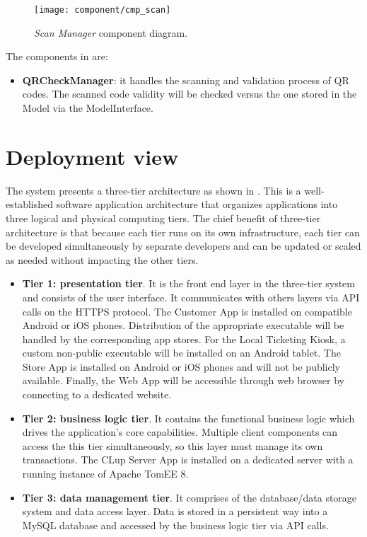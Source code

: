 \begin{figure}[H]
	\centering
	\texttt{[image: component/cmp\_scan]}
	\caption{\textit{Scan Manager} component diagram.}
	\label{fig:cmp_scan}
\end{figure}

The components in  are:
\begin{itemize}
	\item \textbf{QRCheckManager}: it handles the scanning and validation process of QR codes. The scanned code validity will be checked versus the one stored in the Model via the ModelInterface.
\end{itemize}
\clearpage

\section{Deployment view}
The system presents a three-tier architecture as shown in . This is a well-established software application architecture that organizes applications into three logical and physical computing tiers. The chief benefit of three-tier architecture is that because each tier runs on its own infrastructure, each tier can be developed simultaneously by separate developers and can be updated or scaled as needed without impacting the other tiers.

\begin{itemize}
	\item \textbf{Tier 1: presentation tier}. It is the front end layer in the three-tier system and consists of the user interface. It communicates with others layers via API calls on the HTTPS protocol.\newline
	The Customer App is installed on compatible Android or iOS phones. Distribution of the appropriate executable will be handled by the corresponding app stores. For the Local Ticketing Kiosk, a custom non-public executable will be installed on an Android tablet.\newline
	The Store App is installed on Android or iOS phones and will not be publicly available.\newline
	Finally, the Web App will be accessible through web browser by connecting to a dedicated website.
	
	\item \textbf{Tier 2: business logic tier}. It contains the functional business logic which drives the application’s core capabilities. Multiple client components can access the this tier simultaneously, so this layer must manage its own transactions.\newline
	The CLup Server App is installed on a dedicated server with a running instance of Apache TomEE 8.
	
	\item \textbf{Tier 3: data management tier}. It comprises of the database/data storage system and data access layer. Data is stored in a persistent way into a MySQL database and accessed by the business logic tier via API calls.
\end{itemize}


